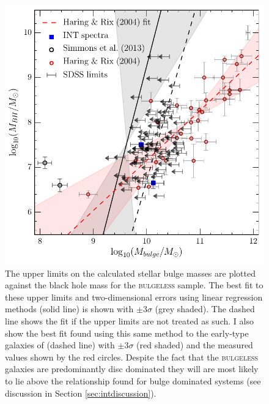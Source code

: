 {\begin{figure}
\centering
\includegraphics[width=\textwidth]{agn/mass_bh_bulge_limits_INT_simmons13_measurements_linmix_fit.pdf}
\caption[Black hole bulge mass relation for the \textsc{bulgeless} sample]{The upper limits on the calculated stellar bulge masses are plotted against the black hole mass for the \textsc{bulgeless} sample. The best fit to these upper limits and two-dimensional errors using linear regression methods (solid line) is shown with $\pm3\sigma$ (grey shaded). The dashed line shows the fit if the upper limits are not treated as such. I also show the best fit found using this same method to the early-type galaxies of \citet{haringrix04} (dashed line) with $\pm3\sigma$ (red shaded) and the measured values shown by the red circles. Despite the fact that the \textsc{bulgeless} galaxies are predominantly disc dominated they will are most likely to lie above the \citet{haringrix04} relationship found for bulge dominated systems (see discussion in Section \ref{sec:intdiscussion}).
}
\label{fig:bulgevsbh}
\end{figure}

}
